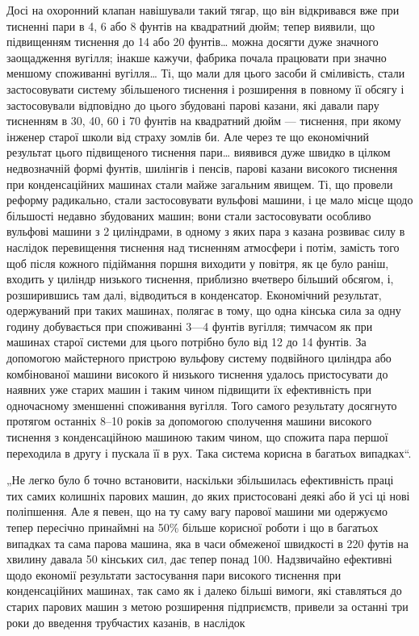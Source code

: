 \parcont{}  %
Досі на охоронний клапан навішували такий тягар, що він відкривався вже при тисненні пари в 4, 6 або
8 фунтів на квадратний
дюйм; тепер виявили, що підвищенням тиснення до 14 або 20 фунтів\dots{} можна досягти дуже значного
заощадження вугілля; інакше
кажучи, фабрика почала працювати при значно меншому споживанні вугілля\dots{} Ті, що мали для цього
засоби й сміливість, стали
застосовувати систему збільшеного тиснення і розширення в повному її обсягу і застосовували
відповідно до цього збудовані парові казани, які давали пару тисненням в 30, 40, 60 і 70 фунтів на
квадратний дюйм — тиснення, при якому інженер старої школи
від страху зомлів би. Але через те що економічний результат
цього підвищеного тиснення пари\dots{} виявився дуже швидко в цілком недвозначній формі фунтів, шилінгів
і пенсів, парові казани
високого тиснення при конденсаційних машинах стали майже загальним явищем. Ті, що провели реформу
радикально, стали застосовувати вульфові машини, і це мало місце щодо більшості недавно
збудованих машин; вони стали застосовувати особливо вульфові
машини з 2 циліндрами, в одному з яких пара з казана розвиває силу в наслідок перевищення тиснення
над тисненням атмосфери і потім, замість того щоб після кожного підіймання поршня
виходити у повітря, як це було раніш, входить у циліндр
низького тиснення, приблизно вчетверо більший обсягом, і, розширившись там далі, відводиться в
конденсатор. Економічний
результат, одержуваний при таких машинах, полягає в тому, що
одна кінська сила за одну годину добувається при споживанні
3—4 фунтів вугілля; тимчасом як при машинах старої системи
для цього потрібно було від 12 до 14 фунтів. За допомогою
майстерного пристрою вульфову систему подвійного циліндра
або комбінованої машини високого й низького тиснення удалось
пристосувати до наявних уже старих машин і таким чином підвищити їх ефективність при одночасному
зменшенні споживання
вугілля. Того самого результату досягнуто протягом останніх
8--10 років за допомогою сполучення машини високого тиснення
з конденсаційною машиною таким чином, що спожита пара першої переходила в другу і пускала її в рух.
Така система корисна
в багатьох випадках“.

„Не легко було б точно встановити, наскільки збільшилась
ефективність праці тих самих колишніх парових машин, до
яких пристосовані деякі або й усі ці нові поліпшення. Але я певен, що на ту саму вагу парової машини
ми одержуємо тепер
пересічно принаймні на 50\% більше корисної роботи і що в багатьох випадках та сама парова машина,
яка в часи обмеженої
швидкості в 220 футів на хвилину давала 50 кінських сил, дає
тепер понад 100. Надзвичайно ефективні щодо економії результати
застосування пари високого тиснення при конденсаційних машинах, так само як і далеко більші вимоги,
які ставляться до старих парових машин з метою розширення підприємств, привели
за останні три роки до введення трубчастих казанів, в наслідок
\parbreak{}  %
